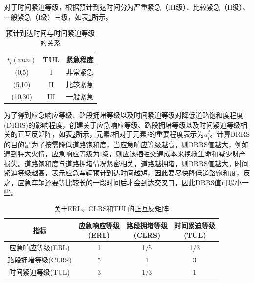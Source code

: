 对于时间紧迫等级，根据预计到达时间分为严重紧急（III级）、比较紧急（II级）、一般紧急（I级）三级，如表\ref{table:TUL}所示。

\begin{table}[H]
	\centering
	\caption{预计到达时间与时间紧迫等级的关系}
	\label{table:TUL}
	\begin{tabular}{|c|c|c|}
		\hline
		${t_i}(min)$ & TUL & 紧急程度 \\ \hline
		(0,5) & I & 非常紧急 \\ \hline
		(5,10) & II & 比较紧急 \\ \hline
		(10,30) & III & 一般紧急 \\ \hline
	\end{tabular}
\end{table}


为了得到应急响应等级、路段拥堵等级以及时间紧迫等级对降低道路饱和度程度(DRRS)的影响程度，创建关于应急响应等级、路段拥堵等级以及时间紧迫等级相关的正互反矩阵，如表\ref{table:juzhen}所示，元素${i}$相对于元素${j}$的重要程度表示为${a_i^j}$。计算DRRS的目的是为了按需降低道路饱和度，当应急响应等级越高，则DRRS值越大，例如遇到特大火情，应急响应等级为I级，则应该牺牲交通成本来挽救生命和减少财产损失。道路饱和度与道路拥堵情况紧密相关，道路越拥堵，则DRRS值越大。时间紧迫等级越高，表示应急车辆预计到达时间越短，因此要尽快降低道路饱和度，反之，应急车辆还要等比较长的一段时间后才会到达交叉口，因此DRRS值可以小一些。


\begin{table}[H]
	\centering
	\caption{关于ERL、CLRS和TUL的正互反矩阵}
	\label{table:juzhen}
	\begin{tabular}{|c|c|c|c|}
		\hline
		指标 & \tabincell{c}{应急响应等级\\(ERL)}  & \tabincell{c}{路段拥堵等级\\(CLRS)} & \tabincell{c}{时间紧迫等级\\(TUL)}  \\ \hline
		应急响应等级(ERL) & 1 & 1/5 & 1/3 \\ \hline
		路段拥堵等级(CLRS) & 5 & 1 & 3 \\ \hline
		时间紧迫等级(TUL) & 3 & 1/3 & 1 \\ \hline
	\end{tabular}
\end{table}

